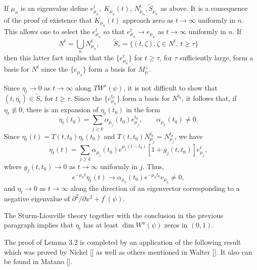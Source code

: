 \documentclass{surv-l}
\theoremstyle{plain}
\theoremstyle{definition}
\numberwithin{equation}{section}
\numberwithin{figure}{chapter}
\begin{document}
If $\mu_{n}$ is an eigenvalue define $e_{\mu_{n}}^{t},\ K_{\mu_{n}}(t)$, $N_{\mu_{n}}^{t},\tilde{S}_{\mu_{n}}$ as above. It is a consequence of the proof of existence that $K_{\mu_{n}}(t)$ approach zero as $ t\rightarrow\infty$ uniformly in $n$. This allows one to select the $e_{\mu_{n}}^{t}$ so that $e_{\mu_{n}}^{t}\rightarrow e_{\mu_{n}}$ as $ t\rightarrow\infty$ uniformly in $n$. If
\begin{equation*}
N^{t}=\bigcup_{n}N_{\mu_{n}}^{t},\qquad \tilde{S}_{\tau}=\{(t,\zeta), \zeta \in N^{t},\, t\geq\tau\}
\end{equation*}
then this latter fact implies that the $\{e_{\mu_{n}}^{t}\}$ for $ t\geq\tau$, for $\tau$ sufficiently large, form a basis for $N^{t}$ since the $\{e_{\mu_{n}}\}$ form a basis for $M_{\mu}^{\perp}$.

Since $\eta_{t}\rightarrow 0$ as $ t\rightarrow\infty$ along $TW^{s}(\psi)$, it is not difficult to show that $(t, \eta_{t})\in \tilde{S}_{\tau}$ for $ t\geq\tau$. Since the $\{e_{{\mu}_{n}}^{{t}_{0}}\}$ form a basis for $N^{t_{0}}$, it follows that, if $\eta_{t}\not\equiv 0$, there is an expansion of $\eta_{t}(t_{0})$ in the form
\begin{equation*}
\eta_{t}(t_{0})=\sum_{j\geq k}\alpha_{\mu_{j}}(t_{0})e_{{\mu}_{j}}^{{t}_{0}},\qquad \alpha_{\mu_{k}}(t_{0})\neq 0.
\end{equation*}
Since $\eta_{t}(t)=T(t, t_{0})\eta_{t}(t_{0})$ and $T(t, t_{0})N_{{\mu}_{j}}^{{t}_{0}}=N_{{\mu}_{j}}^{{t}_{0}}$, we have
\begin{equation*}
\eta_{t}(t)=\sum_{j\geq k}\alpha_{\mu_{j}}(t_{0})e^{\mu_{j}(t-t_{0})}[1+g_{j}(t, t_{0})]e_{\mu_{j}}^{t},
\end{equation*}
where $g_{j}(t, t_{0})\rightarrow 0$ as $ t\rightarrow\infty$ uniformly in $j$. Thus,
\begin{equation*}
e^{-\mu_{k}t}\eta_{t}(t)\rightarrow\alpha_{\mu_{k}}(t_{0})e^{-\mu_{k}t_{0}}e_{\mu_{k}}\neq 0,
\end{equation*}
and $\eta_{t}\rightarrow 0$ as $ t\rightarrow\infty$ along the direction of an eigenvector corresponding to a negative eigenvalue of $\partial^{2}/\partial x^{2}+f^{\prime}(\psi)$.

The Sturm-Liouville theory together with the conclusion in the previous paragraph implies that $\eta_{t}$ has at least $\dim W^{u}(\psi)$ zeros in $(0,1)$.

The proof of Lemma 3.2 is completed by an application of the following result which was proved by Nickel [\citeyear{1962n}] as well as others mentioned in Walter [\citeyear{1970w}]. It also can be found in Matano [\citeyear{1982m}].
\end{document}
